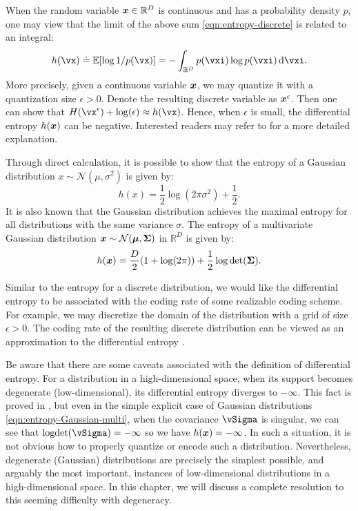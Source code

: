 \documentclass[../../book-main.tex]{subfiles}
\begin{document}
When the random variable $\bm{x} \in \mathbb{R}^{D}$ is continuous and has a probability density $p$, one may view that the limit of the above sum \eqref{eqn:entropy-discrete} is related to an integral:
\begin{equation}
	h(\vx) \doteq \Ex[\log 1/p(\vx)] = - \int_{\R^{D}} p(\vxi) \log p(\vxi) \odif{\vxi}.
	\label{eqn:entropy-differential}
\end{equation}
{More precisely, given a continuous variable $\bm{x}$, we may quantize it with a quantization size $\epsilon > 0$. Denote the resulting discrete variable as $\bm{x}^\epsilon$. Then one can show that $H(\vx^\epsilon) + \log(\epsilon) \approx h(\vx)$. Hence, when $\epsilon$ is small, the differential entropy $h(\bm{x})$ can be negative. Interested readers may refer to \cite{Cover-Thomas} for a more detailed explanation.}

\begin{example}
	Through direct calculation, it is possible to show that the entropy of a Gaussian distribution $x \sim \mathcal{N}(\mu, \sigma^2)$ is given by:
	\begin{equation}
		h(x) = \frac{1}{2}\log (2\pi \sigma^2) + \frac{1}{2}.
		\label{eqn:entropy-Gaussian}
	\end{equation}
	It is also known that the Gaussian distribution achieves the maximal entropy for all distributions with the same variance $\sigma$. The entropy of a multivariate Gaussian distribution $\bm{x} \sim \mathcal{N}(\boldsymbol{\mu}, \boldsymbol{\Sigma})$ in $\mathbb{R}^D$ is given by:
	\begin{equation}
		h(\bm{x}) = \frac{D}{2}(1 + \log(2\pi)) + \frac{1}{2}\log\det(\boldsymbol{\Sigma}).
		\label{eqn:entropy-Gaussian-multi}
	\end{equation}
\end{example}

Similar to the entropy for a discrete distribution, we would like the differential entropy to be associated with the coding rate of some realizable coding scheme. For example, we may discretize the domain of the distribution with a grid of size $\epsilon >0$. The coding rate of the resulting discrete distribution can be viewed as an approximation to the differential entropy \cite{Cover-Thomas}.


Be aware that there are some caveats associated with the definition of differential entropy. For a distribution in a high-dimensional space, when its support becomes degenerate (low-dimensional), its differential entropy diverges to \(-\infty\). This fact is proved in , but even in the simple explicit case of Gaussian distributions \eqref{eqn:entropy-Gaussian-multi}, when the covariance \(\vSigma\) is singular, we can see that \(\logdet(\vSigma) = -\infty\) so we have $h(\bm{x}) = -\infty$. In such a situation, it is not obvious how to properly quantize or encode such a distribution. Nevertheless, degenerate (Gaussian) distributions are precisely the simplest possible, and arguably the most important, instances of low-dimensional distributions in a high-dimensional space. In this chapter, we will discuss a complete resolution to this seeming difficulty with degeneracy.
\end{document}

